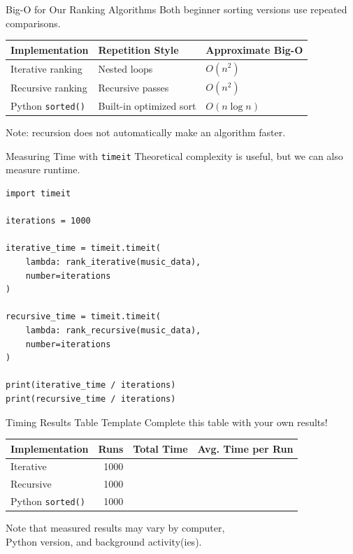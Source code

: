 \documentclass[11pt,aspectratio=43]{beamer}
\begin{document}
\begin{frame}{Big-O for Our Ranking Algorithms}
  Both beginner sorting versions use repeated comparisons.

  \begin{center}
    \begin{tabular}{l l l}
      \toprule
      Implementation & Repetition Style & Approximate Big-O \\
      \midrule
      Iterative ranking & Nested loops & $O(n^2)$ \\
      Recursive ranking & Recursive passes & $O(n^2)$ \\
      Python \texttt{sorted()} & Built-in optimized sort & $O(n \log n)$ \\
      \bottomrule
    \end{tabular}
  \end{center}

  \vspace{0.3cm}
  Note: recursion does not automatically make an algorithm faster.
\end{frame}

\begin{frame}[fragile]{Measuring Time with \texttt{timeit}}
  Theoretical complexity is useful, but we can also measure runtime.

  \begin{lstlisting}
import timeit

iterations = 1000

iterative_time = timeit.timeit(
    lambda: rank_iterative(music_data),
    number=iterations
)

recursive_time = timeit.timeit(
    lambda: rank_recursive(music_data),
    number=iterations
)

print(iterative_time / iterations)
print(recursive_time / iterations)
  \end{lstlisting}
\end{frame}

\begin{frame}{Timing Results Table Template}
  Complete this table with your own results!

  \begin{center}
    \begin{tabular}{l r r r}
      \toprule
      Implementation & Runs & Total Time & Avg. Time per Run \\
      \midrule
      Iterative & 1000 & & \\
      Recursive & 1000 & & \\
      Python \texttt{sorted()} & 1000 & & \\
      \bottomrule
    \end{tabular}
  \end{center}

  \vspace{0.3cm}
  Note that measured results may vary by computer,\\Python version, and background activity(ies).
\end{frame}
\end{document}
